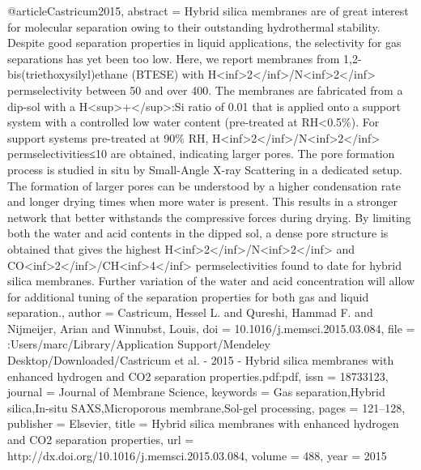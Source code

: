 @article{Castricum2015,
abstract = {Hybrid silica membranes are of great interest for molecular separation owing to their outstanding hydrothermal stability. Despite good separation properties in liquid applications, the selectivity for gas separations has yet been too low. Here, we report membranes from 1,2-bis(triethoxysilyl)ethane (BTESE) with H{\textless}inf{\textgreater}2{\textless}/inf{\textgreater}/N{\textless}inf{\textgreater}2{\textless}/inf{\textgreater} permselectivity between 50 and over 400. The membranes are fabricated from a dip-sol with a H{\textless}sup{\textgreater}+{\textless}/sup{\textgreater}:Si ratio of 0.01 that is applied onto a support system with a controlled low water content (pre-treated at RH{\textless}0.5{\%}). For support systems pre-treated at 90{\%} RH, H{\textless}inf{\textgreater}2{\textless}/inf{\textgreater}/N{\textless}inf{\textgreater}2{\textless}/inf{\textgreater} permselectivities≤10 are obtained, indicating larger pores. The pore formation process is studied in situ by Small-Angle X-ray Scattering in a dedicated setup. The formation of larger pores can be understood by a higher condensation rate and longer drying times when more water is present. This results in a stronger network that better withstands the compressive forces during drying. By limiting both the water and acid contents in the dipped sol, a dense pore structure is obtained that gives the highest H{\textless}inf{\textgreater}2{\textless}/inf{\textgreater}/N{\textless}inf{\textgreater}2{\textless}/inf{\textgreater} and CO{\textless}inf{\textgreater}2{\textless}/inf{\textgreater}/CH{\textless}inf{\textgreater}4{\textless}/inf{\textgreater} permselectivities found to date for hybrid silica membranes. Further variation of the water and acid concentration will allow for additional tuning of the separation properties for both gas and liquid separation.},
author = {Castricum, Hessel L. and Qureshi, Hammad F. and Nijmeijer, Arian and Winnubst, Louis},
doi = {10.1016/j.memsci.2015.03.084},
file = {:Users/marc/Library/Application Support/Mendeley Desktop/Downloaded/Castricum et al. - 2015 - Hybrid silica membranes with enhanced hydrogen and CO2 separation properties.pdf:pdf},
issn = {18733123},
journal = {Journal of Membrane Science},
keywords = {Gas separation,Hybrid silica,In-situ SAXS,Microporous membrane,Sol-gel processing},
pages = {121--128},
publisher = {Elsevier},
title = {{Hybrid silica membranes with enhanced hydrogen and CO2 separation properties}},
url = {http://dx.doi.org/10.1016/j.memsci.2015.03.084},
volume = {488},
year = {2015}
}
